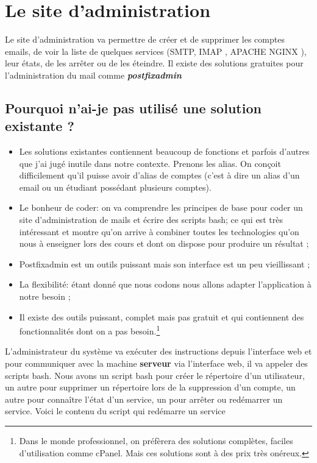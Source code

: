 \documentclass[a4paper,12pt,french]{report} %
\begin{document}
\section{Le site d'administration}
Le site d'administration va permettre de créer et de supprimer  les comptes emails, de voir la liste de quelques services (SMTP, IMAP , APACHE NGINX ), leur états,  de les arrêter ou de les éteindre. %
Il existe des solutions gratuites pour l'administration du mail comme \emph{\textbf{postfixadmin}}
\subsection*{Pourquoi n'ai-je pas utilisé une solution existante ?}
\begin{itemize}
\item Les solutions existantes contiennent beaucoup de fonctions et parfois d'autres que j'ai jugé inutile dans notre contexte. Prenons les alias. On conçoit difficilement qu'il puisse avoir d'alias de comptes (c'est à dire un alias d'un email ou un étudiant possédant plusieurs comptes).
\item Le bonheur de coder: on va comprendre les principes de base pour coder un site d'administration de mails et écrire des scripts bash; ce qui est très intéressant et montre qu'on arrive à combiner toutes les technologies qu'on nous à enseigner lors des cours et dont on dispose pour produire un résultat ;
\item Postfixadmin est un outils puissant mais son interface est un peu vieillissant ;
\item  La flexibilité: étant donné que nous codons nous allons adapter l'application à notre besoin ;
\item Il existe des outils puissant, complet mais pas gratuit et qui contiennent des fonctionnalités dont on a pas besoin.\footnote{Dans le monde professionnel, on préfèrera des solutions complètes, faciles d'utilisation comme cPanel. Mais ces solutions sont à des prix très onéreux.}
\end{itemize}

L'administrateur du système va exécuter des instructions depuis l'interface web et pour communiquer avec la machine \textbf{serveur} via l'interface web, il va appeler des scripts bash. Nous avons un script bash pour créer le répertoire d'un utilisateur, un autre pour supprimer un répertoire lors de la suppression d'un compte, un autre pour connaître l'état d'un service, un pour arrêter ou redémarrer un service. Voici le contenu du script qui redémarre un service 
\end{document}
